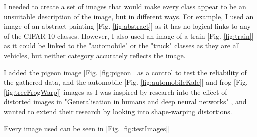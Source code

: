 \documentclass{article}
\begin{document}
I needed to create a set of images that would make every class appear to be an unsuitable description of the image, but in different ways. For example, I used an image of an abstract painting [Fig. \ref{fig:abstract}] as it has no logical links to any of the CIFAR-10 classes. However, I also used an image of a train [Fig. \ref{fig:train}] as it could be linked to the "automobile" or the "truck" classes as they are all vehicles, but neither category accurately reflects the image.

I added the pigeon image [Fig. \ref{fig:pigeon}] as a control to test the reliability of the gathered data, and the automobile [Fig. \ref{fig:automobileKale}] and frog [Fig. \ref{fig:treeFrogWarp}] images as I was inspired by research into the effect of distorted images in "Generalisation in humans and deep neural networks" \cite{geirhos2018generalisation}, and wanted to extend their research by looking into shape-warping distortions.

Every image used can be seen in [Fig. \ref{fig:testImages}]
\end{document}
